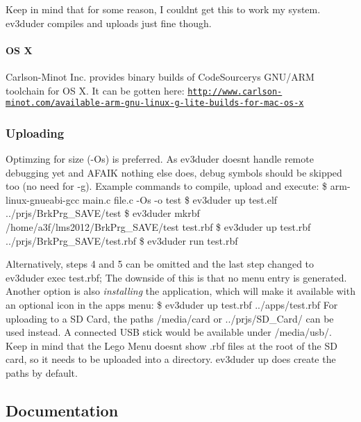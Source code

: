 Keep in mind that for some reason, I couldn\textquotesingle{}t get this to work my system. ev3duder compiles and uploads just fine though.

\paragraph*{O\+S X}

Carlson-\/\+Minot Inc. provides binary builds of Code\+Sourcery\textquotesingle{}s G\+N\+U/\+A\+R\+M toolchain for O\+S X. It can be gotten here\+: \href{http://www.carlson-minot.com/available-arm-gnu-linux-g-lite-builds-for-mac-os-x}{\tt http\+://www.\+carlson-\/minot.\+com/available-\/arm-\/gnu-\/linux-\/g-\/lite-\/builds-\/for-\/mac-\/os-\/x}

\subsubsection*{Uploading}

Optimzing for size (-\/\+Os) is preferred. As ev3duder doesn\textquotesingle{}t handle remote debugging yet and A\+F\+A\+I\+K nothing else does, debug symbols should be skipped too (no need for -\/g). Example commands to compile, upload and execute\+: \$ arm-\/linux-\/gnueabi-\/gcc main.\+c file.\+c -\/\+Os -\/o test \$ ev3duder up test.\+elf ../prjs/\+Brk\+Prg\+\_\+\+S\+A\+V\+E/test \$ ev3duder mkrbf /home/a3f/lms2012/\+Brk\+Prg\+\_\+\+S\+A\+V\+E/test test.\+rbf \$ ev3duder up test.\+rbf ../prjs/\+Brk\+Prg\+\_\+\+S\+A\+V\+E/test.rbf \$ ev3duder run test.\+rbf

Alternatively, steps 4 and 5 can be omitted and the last step changed to {\ttfamily ev3duder exec test.\+rbf}; The downside of this is that no menu entry is generated. Another option is also {\itshape installing} the application, which will make it available with an optional icon in the apps menu\+: \$ ev3duder up test.\+rbf ../apps/test.rbf For uploading to a S\+D Card, the paths {\ttfamily /media/card} or {\ttfamily ../prjs/\+S\+D\+\_\+\+Card/} can be used instead. A connected U\+S\+B stick would be available under {\ttfamily /media/usb/}. Keep in mind that the Lego Menu doesn\textquotesingle{}t show .rbf files at the root of the S\+D card, so it needs to be uploaded into a directory. {\ttfamily ev3duder up} does create the paths by default.

\subsection*{Documentation}

